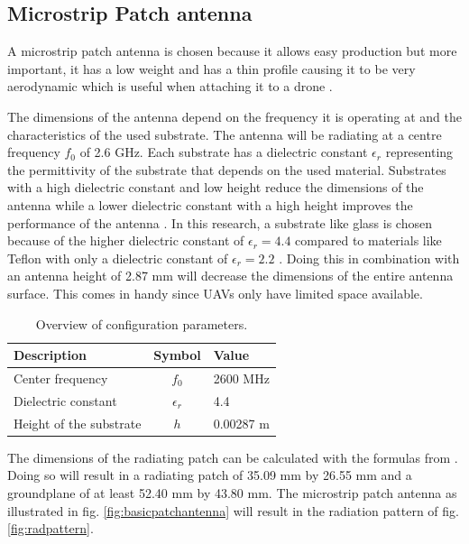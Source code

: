 \documentclass[twocolumn]{phdsymp} %
\begin{document}
\subsection{Microstrip Patch antenna}
A microstrip patch antenna is chosen because it allows easy production but more important, it has a low weight 
and has a thin profile causing it to be very aerodynamic which is useful when attaching it to a drone \cite{J13_microstripadvantages}.

The dimensions of the antenna depend on the frequency it is operating at and the characteristics of the used substrate.
The antenna will be radiating at a centre frequency $f_0$ of 2.6 GHz. Each substrate has a dielectric constant $\epsilon_r$ representing 
the permittivity of the substrate that depends on the used material.
Substrates with a high dielectric constant and low height 
reduce the dimensions of the antenna
while a lower dielectric constant with a high height improves the performance of the antenna \cite{J14_antennadesign,J15_antennadesign}. 
In this research, a substrate like glass 
is chosen because of the higher dielectric constant of $\epsilon_r = 4.4$ compared to materials like Teflon with only a dielectric 
constant of $\epsilon_r = 2.2$ \cite{J14_antennadesign}. 
Doing this in combination with an antenna height of 2.87 mm will decrease the dimensions of the entire antenna surface.
This comes in handy since \gls{UAV}s only have limited space available.
\newline
\newline
\begin{table}[h!]
\centering
\begin{tabular}{|l|c|l|}
\hline
 Description            & Symbol          & Value         \\    \hline
 Center frequency       & $f_0$           & 2600 MHz       \\ 
 Dielectric constant    & $\epsilon_r$    & 4.4         \\ 
 Height of the substrate & $h$             & 0.00287 m    \\ \hline
\end{tabular}
\caption{Overview of configuration parameters.}
\label{table:antennaparas}
\end{table}

The dimensions of the radiating patch can be calculated with the formulas from \cite{J14_antennadesign,J15_antennadesign}.
Doing so will result in a radiating patch of 35.09 mm by 26.55 mm and a groundplane of at least 52.40 mm by 43.80 mm.
The microstrip patch antenna as illustrated in fig. \ref{fig:basicpatchantenna} will result in the radiation pattern of fig. \ref{fig:radpattern}.
\end{document}
